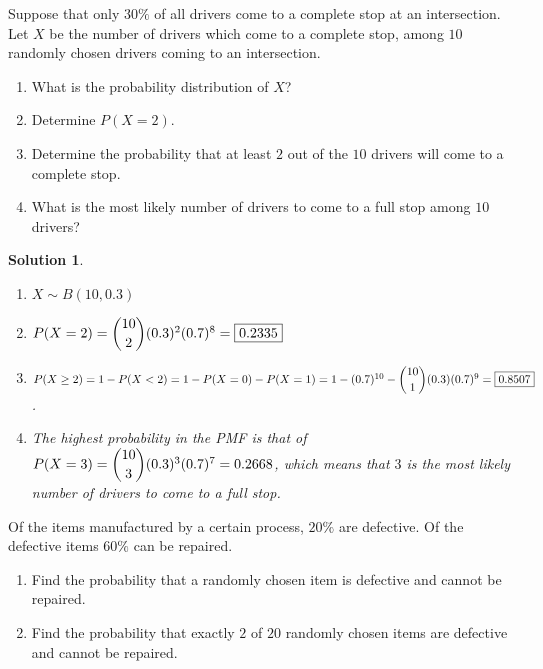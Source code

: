 \documentclass[11pt]{article}
\newtheorem*{solution}{Solution}
\theoremstyle{mystyle}
\renewcommand{\|}{\mid}
\begin{document}
\begin{psproblem}{}{}
    Suppose that only $30\%$ of all drivers come to a complete stop at an intersection. Let $X$ be the number of drivers
    which come to a complete stop, among $10$ randomly chosen drivers coming to an intersection.
    \begin{enumerate}[label=\alph*.]
        \item What is the probability distribution of $X$?
        \item Determine $P(X = 2)$.
        \item Determine the probability that at least $2$ out of the $10$ drivers will come to a complete stop.
        \item What is the most likely number of drivers to come to a full stop among $10$ drivers?
    \end{enumerate}
\end{psproblem}

\begin{solution}
    \leavevmode
    \begin{enumerate}[label=\alph*.]
        \item $X \sim B(10, 0.3)$
        \item $P(X = 2) = \dbinom{10}{2} (0.3)^2 (0.7)^8 = \boxed{0.2335}$
        \item $P(X \ge 2) = 1 - P(X < 2) = 1 - P(X = 0) - P(X = 1) = 1 - (0.7)^{10} - \dbinom{10}{1} (0.3)(0.7)^9 = \boxed{0.8507}$.
        \item The highest probability in the PMF is that of $P(X=3)=\dbinom{10}{3} (0.3)^3(0.7)^7 = 0.2668$,
        which means that $\boxed{3}$ is the most likely number of drivers to come to a full stop.
    \end{enumerate}
\end{solution}

\begin{psproblem}{}{}
    Of the items manufactured by a certain process, $20\%$ are defective. Of the defective items $60\%$ can be repaired.
    \begin{enumerate}[label=\alph*.]
        \item Find the probability that a randomly chosen item is defective and cannot be repaired.
        \item Find the probability that exactly $2$ of $20$ randomly chosen items are defective and cannot be repaired.
    \end{enumerate}
\end{psproblem}
\end{document}
